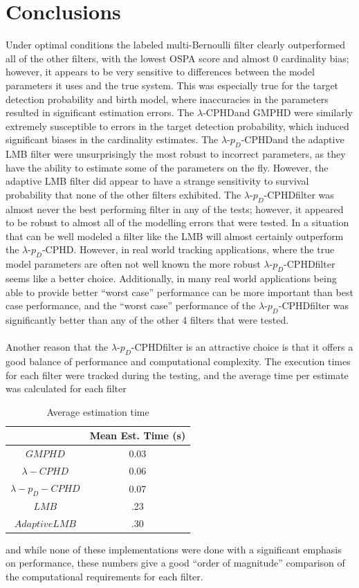 \documentclass{article}
\newcommand{\lcphd}{$\lambda$-CPHD}
\newcommand{\lpdcphd}{$\lambda$-$p_D$-CPHD}
\begin{document}
\section*{Conclusions}
Under optimal conditions the labeled multi-Bernoulli filter clearly outperformed all of the other filters, with the lowest OSPA score and almost 0 cardinality bias; however, it appears to be very sensitive to differences between the model parameters it uses and the true system. This was especially true for the target detection probability and birth model, where inaccuracies in the parameters resulted in significant estimation errors. The \lcphd and GMPHD were similarly extremely susceptible to errors in the target detection probability, which induced significant biases in the cardinality estimates. The \lpdcphd and the adaptive LMB filter were unsurprisingly the most robust to incorrect parameters, as they have the ability to estimate some of the parameters on the fly. However, the adaptive LMB filter did appear to have a strange sensitivity to survival probability that none of the other filters exhibited. The \lpdcphd filter was almost never the best performing filter in any of the tests; however, it appeared to be robust to almost all of the modelling errors that were tested. In a situation that can be well modeled a filter like the LMB will almost certainly outperform the \lpdcphd. However, in real world tracking applications, where the true model parameters are often not well known the more robust \lpdcphd filter seems like a better choice. Additionally, in many  real world applications being able to provide better ``worst case'' performance can be more important than best case performance, and the ``worst case'' performance of the \lpdcphd filter was significantly better than any of the other 4 filters that were tested.\\
\\
Another reason that the \lpdcphd filter is an attractive choice is that it offers a good balance of performance and computational complexity. The execution times for each filter were tracked during the testing, and the average time per estimate was calculated for each filter

\begin{table}[H]
  \centering
  \begin{tabular}{ c| c }
    & Mean Est. Time (s) \\
      \hline
      $GMPHD$ & 0.03 \\
    $\lambda-CPHD$ & 0.06 \\
    $\lambda-p_D-CPHD$ & 0.07 \\
    $LMB$ & .23 \\
    $Adaptive LMB$ & .30 \\
  \end{tabular}
  \caption{Average estimation time}
  \label{tab:exec_time}
\end{table}
and while none of these implementations were done with a significant emphasis on performance, these numbers give a good ``order of magnitude'' comparison of the computational requirements for each filter.


\clearpage
\pagebreak
\printbibliography
\end{document}
